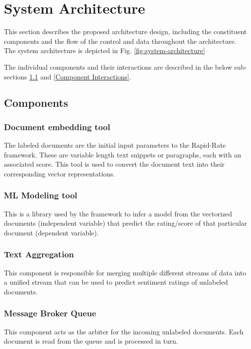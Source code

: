 \documentclass[conference]{IEEEtran}
\begin{document}
\vspace{5mm}

\section{System Architecture}
    This section describes the proposed architecture design, including the constituent components and the flow of the control and data throughout the architecture.
    The system architecture is depicted in Fig. \ref{fig:system-architecture}

    The individual components and their interactions are described in the below sub-sections \ref{Components} and \ref{Component Interactions}.

    \subsection{Components} \label{Components}

        \subsubsection{Document embedding tool}
            The labeled documents are the initial input parameters to the Rapid-Rate framework. These are variable length text snippets or paragraphs, each with an associated score. This tool is used to convert the document text into their corresponding vector representations.

        \subsubsection{ML Modeling tool}
            This is a library used by the framework to infer a model from the vectorized documents (independent variable) that predict the rating/score of that particular document (dependent variable). 

        \subsubsection{Text Aggregation}
            This component is responsible for merging multiple different streams of data into a unified stream that can be used to predict sentiment ratings of unlabeled documents.

        \subsubsection{Message Broker Queue}
            This component acts as the arbiter for the incoming unlabeled documents. 
            Each document is read from the queue and is processed in turn.
\end{document}
